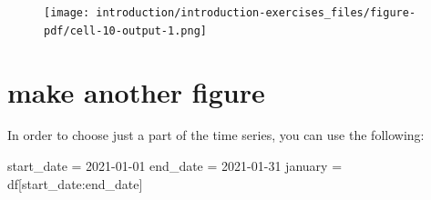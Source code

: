 \documentclass[
  letterpaper,
  DIV=11,
  numbers=noendperiod]{scrreprt}
\newenvironment{Shaded}{\begin{snugshade}}{\end{snugshade}}
\newcommand{\NormalTok}[1]{\textcolor[rgb]{0.00,0.23,0.31}{#1}}
\newcommand{\OperatorTok}[1]{\textcolor[rgb]{0.37,0.37,0.37}{#1}}
\newcommand{\StringTok}[1]{\textcolor[rgb]{0.13,0.47,0.30}{#1}}
\begin{document}
\begin{figure}[H]

{\centering \texttt{[image: introduction/introduction-exercises\_files/figure-pdf/cell-10-output-1.png]}

}

\end{figure}

\hypertarget{make-another-figure}{%
\section{make another figure}\label{make-another-figure}}

In order to choose just a part of the time series, you can use the
following:

\begin{Shaded}
\begin{Highlighting}[]
\NormalTok{start\_date }\OperatorTok{=} \StringTok{\textquotesingle{}2021{-}01{-}01\textquotesingle{}}
\NormalTok{end\_date }\OperatorTok{=} \StringTok{\textquotesingle{}2021{-}01{-}31\textquotesingle{}}
\NormalTok{january }\OperatorTok{=}\NormalTok{ df[start\_date:end\_date]}
\end{Highlighting}
\end{Shaded}
\end{document}

